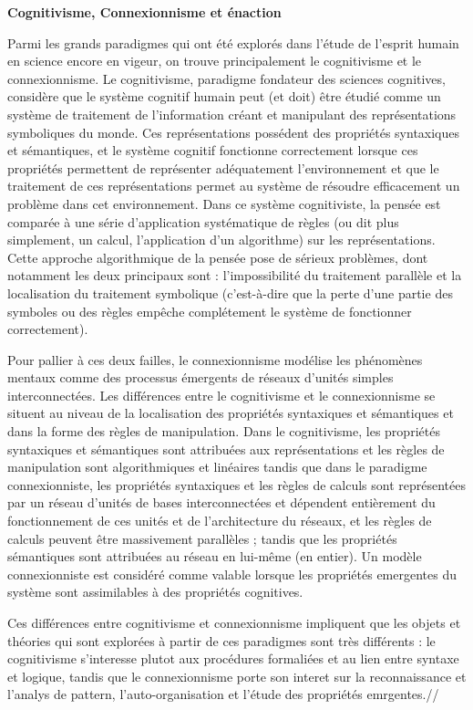\documentclass[12pt]{scrartcl}
\begin{document}
\textbf{Cognitivisme, Connexionnisme et énaction} 

Parmi les grands paradigmes qui ont été explorés dans l'étude de l'esprit humain en science encore en vigeur, on trouve principalement le cognitivisme et le connexionnisme. Le cognitivisme, paradigme fondateur des sciences cognitives, considère que le système cognitif humain peut (et doit) être étudié comme un système de traitement de l'information créant et manipulant des représentations symboliques du monde. Ces représentations possédent des propriétés syntaxiques et sémantiques, et le système cognitif fonctionne correctement lorsque ces propriétés permettent de représenter adéquatement l'environnement et que le traitement de ces représentations permet au système de résoudre efficacement un problème dans cet environnement. Dans ce système cognitiviste, la pensée est comparée à une série d'application systématique de règles (ou dit plus simplement, un calcul, l'application d'un algorithme) sur les représentations. Cette approche algorithmique de la pensée pose de sérieux problèmes, dont notamment les deux principaux sont : l'impossibilité du traitement parallèle et la localisation du traitement symbolique (c'est-à-dire que la perte d'une partie des symboles ou des règles empêche complétement le système de fonctionner correctement). 

Pour pallier à ces deux failles, le connexionnisme modélise les phénomènes mentaux comme des processus émergents de réseaux d'unités simples interconnectées. Les différences entre le cognitivisme et le connexionnisme se situent au niveau de la localisation des propriétés syntaxiques et sémantiques et dans la forme des règles de manipulation. Dans le cognitivisme, les propriétés syntaxiques et sémantiques sont attribuées aux représentations et les règles de manipulation sont algorithmiques et linéaires tandis que dans le paradigme connexionniste, les propriétés syntaxiques et les règles de calculs sont représentées par un réseau d'unités de bases interconnectées et dépendent entièrement du fonctionnement de ces unités et de l'architecture du réseaux, et les règles de calculs peuvent être massivement parallèles ; tandis que les propriétés sémantiques sont attribuées au réseau en lui-même (en entier). Un modèle connexionniste est considéré comme valable lorsque les propriétés emergentes du système sont assimilables à des propriétés cognitives.

Ces différences entre cognitivisme et connexionnisme impliquent que les objets et théories qui sont explorées à partir de ces paradigmes sont très différents : le cognitivisme s'interesse plutot aux procédures formaliées et au lien entre syntaxe et logique, tandis que le connexionnisme porte son interet sur la reconnaissance et l'analys de pattern, l'auto-organisation et l'étude des propriétés emrgentes.//
\end{document}
